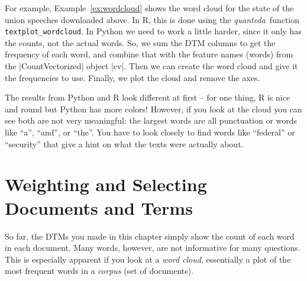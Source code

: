 For example, Example~\ref{ex:wordcloud} shows the word cloud for the state of the union speeches downloaded above.
In R, this is done using the \emph{quanteda}\ function \texttt{textplot\_wordcloud}.
In Python we need to work a little harder, since it only has the counts, not the actual words.
So, we sum the DTM columns to get the frequency of each word, and combine that with the feature names (words)
from the |CountVectorized| object |cv|. Then we can create the word cloud and give it the frequencies to use.
Finally, we plot the cloud and remove the axes.


The results from Python and R look different at first -- for one thing, R is nice and round but Python has more colors!
However, if you look at the cloud you can see both are not very meaningful: the largest words are all punctuation or words like
``a'', ``and'', or ``the''.
You have to look closely to find words like ``federal'' or ``security'' that give a hint on what the texts were actually about.



%

\section{Weighting and Selecting Documents and Terms}
\label{sec:dtmselect}

So far, the DTMs you made in this chapter simply show the count of each word in each document.
Many words, however, are not informative for many questions.
This is especially apparent if you look at a \emph{word cloud},
essentially a plot of the most frequent words in a  \emph{corpus} (set of documents).

